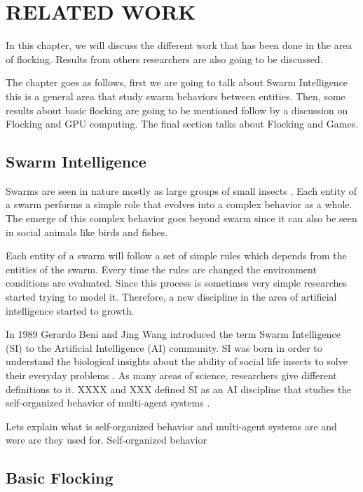 \chapter{RELATED WORK}

In this chapter, we will discuss the different work that has been done in the area of flocking. Results from others researchers are also going to be discussed. 

The chapter goes as follows, first we are going to talk about Swarm Intelligence this is a general area that study swarm behaviors between entities. Then, some results about basic flocking are going to be mentioned follow by a discussion on Flocking and GPU computing. The final section talks about Flocking and Games.

\section{Swarm Intelligence}
Swarms are seen in nature mostly as large groups of small insects \cite{?}. Each entity of a swarm performs a simple role that evolves into a complex behavior as a whole. The emerge of this complex behavior goes beyond swarm since it can also be seen in social animals like birds and fishes. 


Each entity of a swarm will follow a set of simple rules which depends from the entities of the swarm. Every time the rules are changed the environment conditions are evaluated. Since this process is sometimes very simple researches started trying to model it. Therefore, a new discipline in the area of artificial intelligence started to growth.

In 1989 Gerardo Beni and Jing Wang introduced the term Swarm Intelligence (SI) to the Artificial Intelligence (AI) community. SI was born in order to understand the biological insights about the ability of social life insects to solve their everyday problems \cite{BioPrinciplesSI}. As many areas of science, researchers give different definitions to it. XXXX and XXX defined SI as an AI discipline that studies the self-organized behavior of multi-agent systems \cite{?}. 

Lets explain what is self-organized behavior and multi-agent systems are and were are they used for. Self-organized behavior

\section{Basic Flocking}

